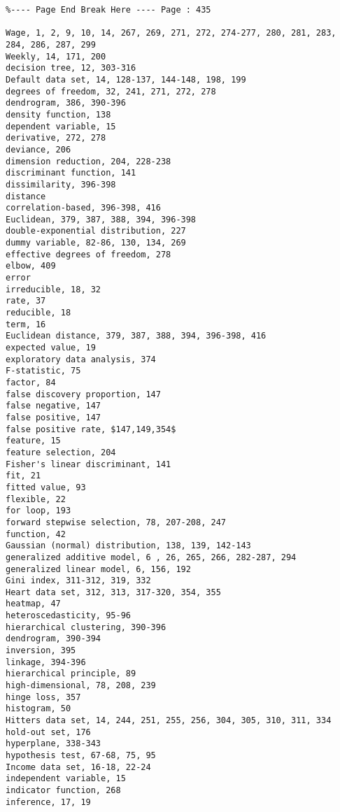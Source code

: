 \documentclass[10pt]{article}
\begin{document}
\begin{verbatim}
%---- Page End Break Here ---- Page : 435

Wage, 1, 2, 9, 10, 14, 267, 269, 271, 272, 274-277, 280, 281, 283, 284, 286, 287, 299
Weekly, 14, 171, 200
decision tree, 12, 303-316
Default data set, 14, 128-137, 144-148, 198, 199
degrees of freedom, 32, 241, 271, 272, 278
dendrogram, 386, 390-396
density function, 138
dependent variable, 15
derivative, 272, 278
deviance, 206
dimension reduction, 204, 228-238
discriminant function, 141
dissimilarity, 396-398
distance
correlation-based, 396-398, 416
Euclidean, 379, 387, 388, 394, 396-398
double-exponential distribution, 227
dummy variable, 82-86, 130, 134, 269
effective degrees of freedom, 278
elbow, 409
error
irreducible, 18, 32
rate, 37
reducible, 18
term, 16
Euclidean distance, 379, 387, 388, 394, 396-398, 416
expected value, 19
exploratory data analysis, 374
F-statistic, 75
factor, 84
false discovery proportion, 147
false negative, 147
false positive, 147
false positive rate, $147,149,354$
feature, 15
feature selection, 204
Fisher's linear discriminant, 141
fit, 21
fitted value, 93
flexible, 22
for loop, 193
forward stepwise selection, 78, 207-208, 247
function, 42
Gaussian (normal) distribution, 138, 139, 142-143
generalized additive model, 6 , 26, 265, 266, 282-287, 294
generalized linear model, 6, 156, 192
Gini index, 311-312, 319, 332
Heart data set, 312, 313, 317-320, 354, 355
heatmap, 47
heteroscedasticity, 95-96
hierarchical clustering, 390-396
dendrogram, 390-394
inversion, 395
linkage, 394-396
hierarchical principle, 89
high-dimensional, 78, 208, 239
hinge loss, 357
histogram, 50
Hitters data set, 14, 244, 251, 255, 256, 304, 305, 310, 311, 334
hold-out set, 176
hyperplane, 338-343
hypothesis test, 67-68, 75, 95
Income data set, 16-18, 22-24
independent variable, 15
indicator function, 268
inference, 17, 19


\end{verbatim}
\end{document}
